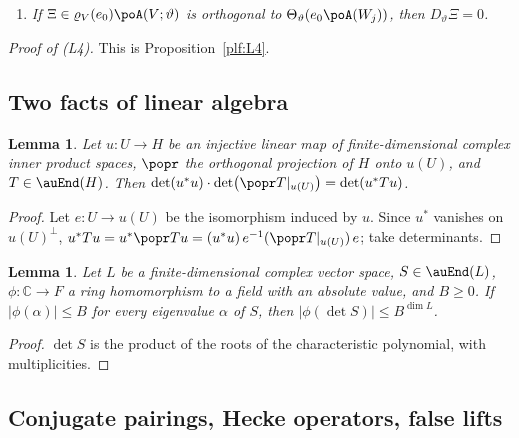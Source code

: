 \documentclass[10pt]{amsart}
\newtheorem{lemma}[theorem]{Lemma}
\theoremstyle{definition}
\theoremstyle{remark}
\newcommand{\C}{\mathbb C}
\begin{document}
\begin{enumerate}
\item[(L4)] \emph{If $\Xi\in\varrho_V(e_0)\poA(V;\vartheta)$ is orthogonal to
$\Theta_\vartheta(e_0\poA(W_j))$, then $D_\vartheta\Xi=0$.}
\end{enumerate}
\noindent\emph{Proof of {\rm(L4)}.} This is Proposition~\ref{plf:L4}.


\subsection{Two facts of linear algebra}\label{po:ss-linalg}

\begin{lemma}\label{po:det}
Let $u\colon U\to H$ be an injective linear map of finite-dimensional complex inner product
spaces, $\popr$ the orthogonal projection of $H$ onto $u(U)$, and $T\in\auEnd(H)$. Then
$\det(u^*u)\cdot\det\bigl(\popr T|_{u(U)}\bigr)=\det(u^*Tu)$.
\end{lemma}
\begin{proof}
Let $e\colon U\to u(U)$ be the isomorphism induced by $u$. Since $u^*$ vanishes on $u(U)^\perp$,
$u^*Tu=u^*\popr Tu=(u^*u)\,e^{-1}(\popr T|_{u(U)})\,e$; take determinants.
\end{proof}

\begin{lemma}\label{po:eig}
Let $L$ be a finite-dimensional complex vector space, $S\in\auEnd(L)$, $\phi\colon\C\to F$ a ring
homomorphism to a field with an absolute value, and $B\ge0$. If $|\phi(\alpha)|\le B$ for every
eigenvalue $\alpha$ of $S$, then $|\phi(\det S)|\le B^{\dim L}$.
\end{lemma}
\begin{proof}
$\det S$ is the product of the roots of the characteristic polynomial, with multiplicities.
\end{proof}

\subsection{Conjugate pairings, Hecke operators, false lifts}\label{po:ss-false}
\end{document}

